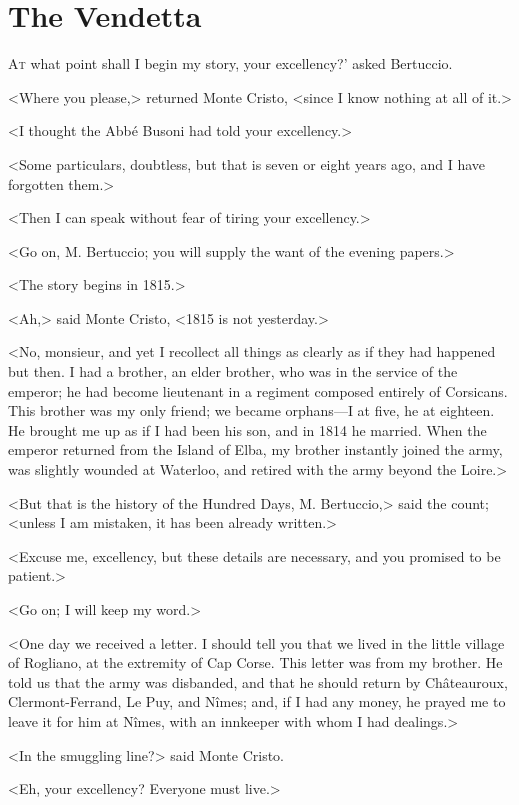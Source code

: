 \chapter{The Vendetta} 

 \lettrine[ante=']{A}{t} what point shall I begin my story, your excellency?' asked Bertuccio. 

 <Where you please,> returned Monte Cristo, <since I know nothing at all of it.> 

 <I thought the Abbé Busoni had told your excellency.> 

 <Some particulars, doubtless, but that is seven or eight years ago, and I have forgotten them.> 

 <Then I can speak without fear of tiring your excellency.> 

 <Go on, M. Bertuccio; you will supply the want of the evening papers.> 

 <The story begins in 1815.> 

 <Ah,> said Monte Cristo, <1815 is not yesterday.> 

 <No, monsieur, and yet I recollect all things as clearly as if they had happened but then. I had a brother, an elder brother, who was in the service of the emperor; he had become lieutenant in a regiment composed entirely of Corsicans. This brother was my only friend; we became orphans—I at five, he at eighteen. He brought me up as if I had been his son, and in 1814 he married. When the emperor returned from the Island of Elba, my brother instantly joined the army, was slightly wounded at Waterloo, and retired with the army beyond the Loire.> 

 <But that is the history of the Hundred Days, M. Bertuccio,> said the count; <unless I am mistaken, it has been already written.> 

 <Excuse me, excellency, but these details are necessary, and you promised to be patient.> 

 <Go on; I will keep my word.> 

 <One day we received a letter. I should tell you that we lived in the little village of Rogliano, at the extremity of Cap Corse. This letter was from my brother. He told us that the army was disbanded, and that he should return by Châteauroux, Clermont-Ferrand, Le Puy, and Nîmes; and, if I had any money, he prayed me to leave it for him at Nîmes, with an innkeeper with whom I had dealings.> 

 <In the smuggling line?> said Monte Cristo. 

 <Eh, your excellency? Everyone must live.> 


